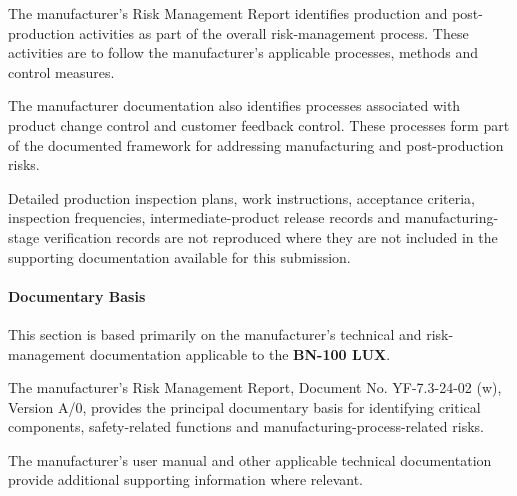 The manufacturer's Risk Management Report identifies production
and post-production activities as part of the overall
risk-management process. These activities are to follow the
manufacturer's applicable processes, methods and control measures.

The manufacturer documentation also identifies processes
associated with product change control and customer feedback
control. These processes form part of the documented framework
for addressing manufacturing and post-production risks.

Detailed production inspection plans, work instructions, acceptance
criteria, inspection frequencies, intermediate-product release
records and manufacturing-stage verification records are not
reproduced where they are not included in the supporting
documentation available for this submission.

\paragraph{Documentary Basis}

This section is based primarily on the manufacturer's technical
and risk-management documentation applicable to the
\textbf{BN-100 LUX}.

The manufacturer's Risk Management Report, Document No.
YF-7.3-24-02 (w), Version A/0, provides the principal documentary
basis for identifying critical components, safety-related
functions and manufacturing-process-related risks.

The manufacturer's user manual and other applicable technical
documentation provide additional supporting information where
relevant.

